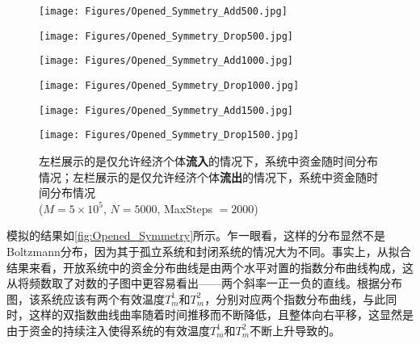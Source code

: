 \documentclass[tsinghuacite]{HustGraduPaper}
\begin{document}
			
			\begin{figure}[h]
			\centering                                                 

			\begin{minipage}[t]{0.45\textwidth}                                                      
			\texttt{[image: Figures/Opened\_Symmetry\_Add500.jpg]}               
			\end{minipage}
			\begin{minipage}[t]{0.45\textwidth}                 
			\texttt{[image: Figures/Opened\_Symmetry\_Drop500.jpg]}               
			\end{minipage}
			
			\begin{minipage}[t]{0.45\textwidth}                                                      
			\texttt{[image: Figures/Opened\_Symmetry\_Add1000.jpg]}               
			\end{minipage}
			\begin{minipage}[t]{0.45\textwidth}                 
			\texttt{[image: Figures/Opened\_Symmetry\_Drop1000.jpg]}               
			\end{minipage}
			
			\begin{minipage}[t]{0.45\textwidth}                                                      
			\texttt{[image: Figures/Opened\_Symmetry\_Add1500.jpg]}               
			\end{minipage}
			\begin{minipage}[t]{0.45\textwidth}                 
			\texttt{[image: Figures/Opened\_Symmetry\_Drop1500.jpg]}               
			\end{minipage}
			\caption{左栏展示的是仅允许经济个体{\bfseries 流入}的情况下，系统中资金随时间分布情况；左栏展示的是仅允许经济个体{\bfseries 流出}的情况下，系统中资金随时间分布情况 \\ ($M = 5 \times 10^5$, $N = 5000$, MaxSteps $= 2000$)} 
			\label{fig:Opened_Symmetry_AddDrop}                                                        
			\end{figure}
			
			
			模拟的结果如\autoref{fig:Opened_Symmetry}所示。乍一眼看，这样的分布显然不是Boltzmann分布，因为其于孤立系统和封闭系统的情况大为不同。事实上，从拟合结果来看，开放系统中的资金分布曲线是由两个水平对置的指数分布曲线构成，这从将频数取了对数的子图中更容易看出——两个斜率一正一负的直线。根据分布图，该系统应该有两个有效温度$T_m^{1}$和$T_m^{2}$，分别对应两个指数分布曲线，与此同时，这样的双指数曲线曲率随着时间推移而不断降低，且整体向右平移，这显然是由于资金的持续注入使得系统的有效温度$T_m^{1}$和$T_m^{2}$不断上升导致的。
						
\end{document}
